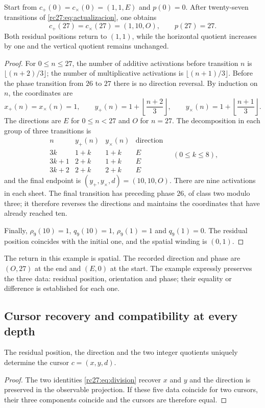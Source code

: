 \begin{theorem}
\label{rc27:thm:ejemplo}
Start from
$c_+(0)=c_\times(0)=(1,1,E)$ and $p(0)=0$.
After twenty-seven transitions of
\eqref{rc27:eq:actualizacion}, one obtains
\[
c_+(27)=c_\times(27)=(1,10,O),\qquad p(27)=27.
\]
Both residual positions return to $(1,1)$, while the
horizontal quotient increases by one and the vertical quotient remains
unchanged.
\end{theorem}
\begin{proof}
For $0\le n\le27$, the number of additive activations before
transition $n$ is $\lfloor(n+2)/3\rfloor$; the number of
multiplicative activations is $\lfloor(n+1)/3\rfloor$. Before
the phase transition from $26$ to $27$ there is no direction reversal.
By induction on $n$, the coordinates are
\[
x_+(n)=x_\times(n)=1,\qquad
y_+(n)=1+\left\lfloor\frac{n+2}{3}\right\rfloor,\qquad
y_\times(n)=1+\left\lfloor\frac{n+1}{3}\right\rfloor.
\]
The directions are $E$ for $0\le n<27$ and $O$ for $n=27$.
The decomposition in each group of three transitions is
\[
\begin{array}{c|c|c|c}
n&y_+(n)&y_\times(n)&\text{direction}\\\hline
3k&1+k&1+k&E\\
3k+1&2+k&1+k&E\\
3k+2&2+k&2+k&E
\end{array}
\quad(0\le k\le8),
\]
and the final endpoint is $(y_+,y_\times,d)=(10,10,O)$.
There are nine activations in each sheet. The final transition has preceding
phase $26$, of class two modulo three; it therefore reverses the
directions and maintains the coordinates that have already reached ten.

Finally, $\rho_9(10)=1$, $q_9(10)=1$,
$\rho_9(1)=1$ and $q_9(1)=0$. The residual position coincides with
the initial one, and the spatial winding is $(0,1)$.
\end{proof}

The return in this example is spatial. The recorded direction and phase
are $(O,27)$ at the end and $(E,0)$ at the start. The example
expressly preserves the three data: residual position, orientation and
phase; their equality or difference is established for each one.

\subsection{Cursor recovery and compatibility at every depth}

\begin{proposition}
The residual position, the direction and the two integer quotients
uniquely determine the cursor $c=(x,y,d)$.
\end{proposition}
\begin{proof}
The two identities \eqref{rc27:eq:division} recover $x$ and $y$
and the direction is preserved in the observable projection. If these
five data coincide for two cursors, their three
components coincide and the cursors are therefore equal.
\end{proof}

